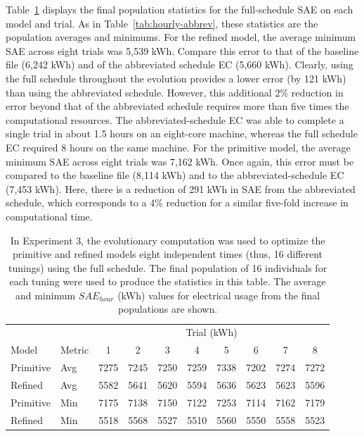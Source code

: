 \documentclass[preprint, review, 12pt]{elsarticle}
\begin{document}
Table~\ref{tab:hourly-full} displays the final population statistics for the full-schedule SAE on each model and trial. As in Table~\ref{tab:hourly-abbrev}, these statistics are the population averages and minimums. For the refined model, the average minimum SAE across eight trials was 5,539 kWh. Compare this error to that of the baseline file (6,242 kWh) and of the abbreviated schedule EC (5,660 kWh). Clearly, using the full schedule throughout the evolution provides a lower error (by 121 kWh) than using the abbreviated schedule. However, this additional 2\% reduction in error beyond that of the abbreviated schedule requires more than five times the computational resources. The abbreviated-schedule EC was able to complete a single trial in about 1.5 hours on an eight-core machine, whereas the full schedule EC required 8 hours on the same machine. For the primitive model, the average minimum SAE across eight trials was 7,162 kWh. Once again, this error must be compared to the baseline file (8,114 kWh) and to the abbreviated-schedule EC (7,453 kWh). Here, there is a reduction of 291 kWh in SAE from the abbreviated schedule, which corresponds to a 4\% reduction for a similar five-fold increase in computational time.

\begin{table}[htbp]
\centering
\caption{In Experiment 3, the evolutionary computation was used to optimize the primitive and refined models eight independent times (thus, 16 different tunings) using the full schedule. The final population of 16 individuals for each tuning were used to produce the statistics in this table. The average and minimum $SAE_{hour}$ (kWh) values for electrical usage from the final populations are shown.}
\label{tab:hourly-full}
\begin{tabular}{llcccccccc}
\toprule
 &  & \multicolumn{8}{c}{Trial (kWh)}\\
Model & Metric & 1 & 2 & 3 & 4 & 5 & 6 & 7 & 8\\
\midrule
Primitive & Avg & 7275 & 7245 & 7250 & 7259 & 7338 & 7202 & 7274 & 7272\\\rowcolor{DarkRow}
Refined   & Avg & 5582 & 5641 & 5620 & 5594 & 5636 & 5623 & 5623 & 5596\\
Primitive & Min & 7175 & 7138 & 7150 & 7122 & 7253 & 7114 & 7162 & 7179\\\rowcolor{DarkRow}
Refined   & Min & 5518 & 5568 & 5527 & 5510 & 5560 & 5550 & 5558 & 5523\\
\bottomrule
\end{tabular}
\end{table}
\end{document}
